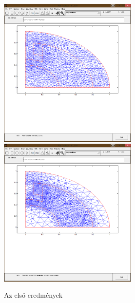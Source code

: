 \begin{figure}[!h]
	\centering
	\includegraphics[trim = 15mm 80mm 10mm 40mm,clip, width=69mm, keepaspectratio]{figures/terek/mesh1.png}\hspace{5mm}
	\includegraphics[trim = 15mm 80mm 10mm 40mm,clip, width=69mm, keepaspectratio]{figures/terek/mesh2.png}
	\caption{Az első eredmények}
	\label{fig:adaptive}
\end{figure}
























